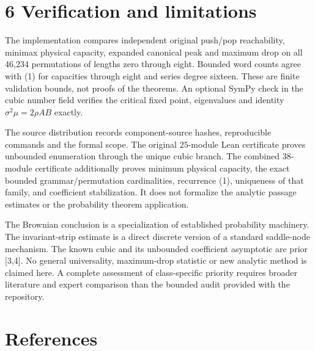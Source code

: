 \documentclass[11pt,letterpaper]{article}
\begin{document}
\section{6 Verification and
limitations}\label{verification-provenance-and-limitations}

The implementation compares independent original push/pop reachability,
minimax physical capacity, expanded canonical peak and maximum drop on
all 46,234 permutations of lengths zero through eight. Bounded word
counts agree with (1) for capacities through eight and series degree
sixteen. These are finite validation bounds, not proofs of the theorems.
An optional SymPy check in the cubic number field verifies the critical
fixed point, eigenvalues and identity \(\sigma^2\mu=2\rho AB\) exactly.

The source distribution records component-source hashes, reproducible commands and the formal scope. The original $25$-module Lean certificate proves unbounded enumeration through the unique cubic branch. The combined $38$-module certificate additionally proves minimum physical capacity, the exact bounded grammar/permutation cardinalities, recurrence (1), uniqueness of that family, and coefficient stabilization. It does not formalize the analytic passage estimates or the probability theorem application.


The Brownian conclusion is a specialization of established probability
machinery. The invariant-strip estimate is a direct discrete version of
a standard saddle-node mechanism. The known cubic and its unbounded
coefficient asymptotic are prior {[}3,4{]}. No general universality,
maximum-drop statistic or new analytic method is claimed here. A
complete assessment of class-specific priority requires broader
literature and expert comparison than the bounded audit provided with
the repository.

\section{References}\label{references}
\end{document}

